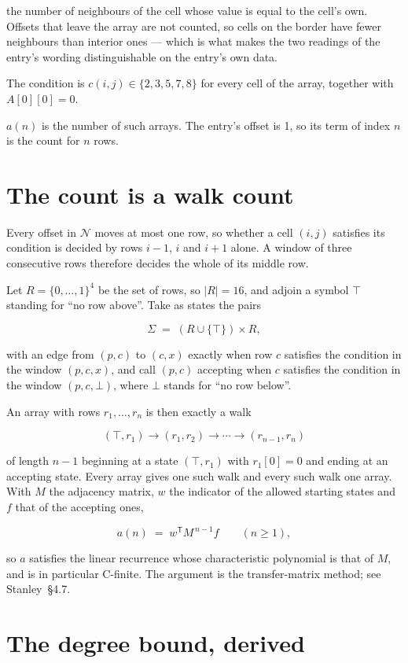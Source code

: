 \documentclass[11pt]{article}
\theoremstyle{definition}
\begin{document}
the number of neighbours of the cell whose value is equal to the cell's own. Offsets that leave the array are not counted, so cells on the border have fewer neighbours than interior ones --- which is what makes the two readings of the entry's wording distinguishable on the entry's own data.

The condition is $c(i,j) \in \{2, 3, 5, 7, 8\}$ for every cell of the array, together with $A[0][0]=0$.

$a(n)$ is the number of such arrays. The entry's offset is 1, so its term of index $n$ is the count for $n$ rows.

\section{The count is a walk count}

Every offset in $\mathcal{N}$ moves at most one row, so whether a cell $(i,j)$ satisfies its condition is decided by rows $i-1$, $i$ and $i+1$ alone. A window of three consecutive rows therefore decides the whole of its middle row.

Let $R = \{0,\dots,1\}^{4}$ be the set of rows, so $|R| = 16$, and adjoin a symbol $\top$ standing for ``no row above''. Take as states the pairs

\[\Sigma \;=\; (R \cup \{\top\}) \times R,\]

with an edge from $(p,c)$ to $(c,x)$ exactly when row $c$ satisfies the condition in the window $(p,c,x)$, and call $(p,c)$ accepting when $c$ satisfies the condition in the window $(p,c,\bot)$, where $\bot$ stands for ``no row below''.

An array with rows $r_1,\dots,r_n$ is then exactly a walk

\[(\top,r_1) \to (r_1,r_2) \to \cdots \to (r_{n-1},r_n)\]

of length $n-1$ beginning at a state $(\top,r_1)$ with $r_1[0]=0$ and ending at an accepting state. Every array gives one such walk and every such walk one array. With $M$ the adjacency matrix, $w$ the indicator of the allowed starting states and $f$ that of the accepting ones,

\[a(n) \;=\; w^{\mathsf T} M^{\,n-1} f \qquad (n \ge 1),\]

so $a$ satisfies the linear recurrence whose characteristic polynomial is that of $M$, and is in particular C-finite. The argument is the transfer-matrix method; see Stanley~\S4.7.

\section{The degree bound, derived}
\end{document}
